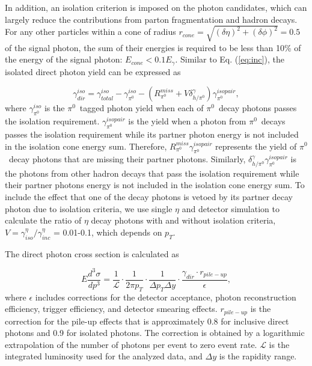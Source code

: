 \documentclass[twocolumn,letterpaper,aps,prl,longbibliography,superscriptaddress,floatfix]{revtex4-2}
\newcommand{\pT}{\ensuremath{p_T}}
\newcommand{\pizero}{\ensuremath{\pi^0}}
\begin{document}
In addition, an isolation criterion is imposed on the photon candidates, which can largely reduce the contributions from parton fragmentation and hadron decays. For any other particles within a cone of radius $r_{cone} = \sqrt{(\delta\eta)^2 + (\delta\phi)^2} = 0.5$ of the signal photon, the sum of their energies is required to be less than 10\% of the energy of the signal photon: $E_{cone} < 0.1 E_{\gamma}$. Similar to Eq. (\ref{eq:inc}), the isolated direct photon yield can be expressed as

\begin{equation} \label{eq:iso}
\gamma_{dir}^{iso} = \gamma_{total}^{iso} - \gamma_{\pi^0}^{iso} - \left( R_{\pi^0}^{miss} + V\delta_{h/\pi^0}^{\gamma} \right) \gamma_{\pi^0}^{isopair},
\end{equation}
where $\gamma_{\pi^0}^{iso}$ is the \pizero \ tagged photon yield when each of \pizero\ decay photons passes the isolation requirement. $\gamma_{\pi^0}^{isopair}$ is the yield when a photon from \pizero\ decays passes the isolation requirement while its partner photon energy is not included in the isolation cone energy sum. Therefore, $R_{\pi^0}^{miss}\gamma_{\pi^0}^{isopair}$ represents the yield of \pizero\ decay photons that are missing their partner photons. Similarly, $\delta_{h/\pi^0}^{\gamma}\gamma_{\pi^0}^{isopair}$ is the photons from other hadron decays that pass the isolation requirement while their partner photons energy is not included in the isolation cone energy sum. To include the effect that one of the decay photons is vetoed by its partner decay photon due to isolation criteria, we use single $\eta$ and detector simulation to calculate the ratio of $\eta$ decay photons with and without isolation criteria, $V = \gamma_{iso}^{\eta}/\gamma_{inc}^{\eta}$ = 0.01-0.1, which depends on \pT.

The direct photon cross section is calculated as

\begin{equation} \label{eq:xsecex}
E\frac{d^3\sigma}{dp^3} = \frac{1}{\mathcal{L}} \cdot \frac{1}{2\pi p_T} \cdot \frac{1}{\Delta p_T \Delta y} \cdot \frac{\gamma_{dir} \cdot r_{pile-up}}{\epsilon},
\end{equation}
where $\epsilon$ includes corrections for the detector acceptance, photon reconstruction efficiency, trigger efficiency, and detector smearing effects. $r_{pile-up}$ is the correction for the pile-up effects that is approximately 0.8 for inclusive direct photons and 0.9 for isolated photons. The correction is obtained by a logarithmic extrapolation of the number of photons per event to zero event rate. $\mathcal{L}$ is the integrated luminosity used for the analyzed data, and $\Delta y$ is the rapidity range. 
\end{document}

